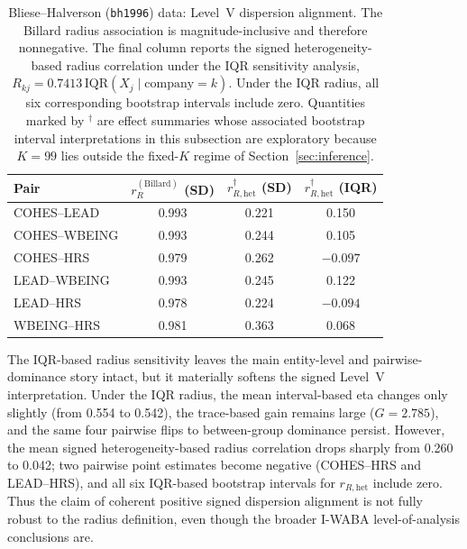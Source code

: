 \documentclass[preprint, times, 12pt, authoryear]{elsarticle}
\begin{document}
\begin{table}[ht]
	\centering
	\caption{Bliese--Halverson (\texttt{bh1996}) data: Level~V dispersion alignment. The Billard radius association is magnitude-inclusive and therefore nonnegative. The final column reports the signed heterogeneity-based radius correlation under the IQR sensitivity analysis, $R_{kj}=0.7413\,\mathrm{IQR}(X_j\mid \mathrm{company}=k)$. Under the IQR radius, all six corresponding bootstrap intervals include zero. Quantities marked by \(^\dagger\) are effect summaries whose associated bootstrap interval interpretations in this subsection are exploratory because $K=99$ lies outside the fixed-$K$ regime of Section~\ref{sec:inference}.}
	\label{tab:bh1996_level5}
	\begin{tabular}{lccc}
		\toprule
		Pair & $r_R^{(\mathrm{Billard})}$ (SD) & $r_{R,\mathrm{het}}^\dagger$ (SD) & $r_{R,\mathrm{het}}^\dagger$ (IQR) \\
		\midrule
		COHES--LEAD   & 0.993 & 0.221 & 0.150 \\
		COHES--WBEING & 0.993 & 0.244 & 0.105 \\
		COHES--HRS    & 0.979 & 0.262 & $-0.097$ \\
		LEAD--WBEING  & 0.993 & 0.245 & 0.122 \\
		LEAD--HRS     & 0.978 & 0.224 & $-0.094$ \\
		WBEING--HRS   & 0.981 & 0.363 & 0.068 \\
		\bottomrule
	\end{tabular}
\end{table}

The IQR-based radius sensitivity leaves the main entity-level and pairwise-dominance story intact, but it materially softens the signed Level~V interpretation. Under the IQR radius, the mean interval-based eta changes only slightly (from 0.554 to 0.542), the trace-based gain remains large ($G=2.785$), and the same four pairwise flips to between-group dominance persist. However, the mean signed heterogeneity-based radius correlation drops sharply from 0.260 to 0.042; two pairwise point estimates become negative (COHES--HRS and LEAD--HRS), and all six IQR-based bootstrap intervals for $r_{R,\mathrm{het}}$ include zero. Thus the claim of coherent positive signed dispersion alignment is not fully robust to the radius definition, even though the broader I-WABA level-of-analysis conclusions are.
\end{document}
